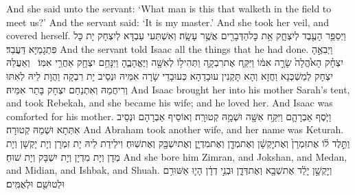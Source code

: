 {And she said unto the servant: ‘What man is this that walketh in the field to meet us?’ And the servant said: ‘It is my master.’ And she took her veil, and covered herself.}{}
{וַיְסַפֵּ֥ר הָעֶ֖בֶד לְיִצְחָ֑ק אֵ֥ת כׇּל\maqqaf הַדְּבָרִ֖ים אֲשֶׁ֥ר עָשָֽׂה׃}
{וְאִשְׁתַּעִי עַבְדָּא לְיִצְחָק יָת כָּל פִּתְגָמַיָּא דַּעֲבַד׃}
{And the servant told Isaac all the things that he had done.}{}
{וַיְבִאֶ֣הָ יִצְחָ֗ק הָאֹ֙הֱלָה֙ שָׂרָ֣ה אִמּ֔וֹ וַיִּקַּ֧ח אֶת\maqqaf רִבְקָ֛ה וַתְּהִי\maqqaf ל֥וֹ לְאִשָּׁ֖ה וַיֶּאֱהָבֶ֑הָ וַיִּנָּחֵ֥ם יִצְחָ֖ק אַחֲרֵ֥י אִמּֽוֹ׃ \petucha }
{וְאַעֲלַהּ יִצְחָק לְמַשְׁכְּנָא וַחֲזָא וְהָא תָּקְנִין עוּבָדַהָא כְּעוּבָדֵי שָׂרָה אִמֵּיהּ וּנְסֵיב יָת רִבְקָה וַהֲוָת לֵיהּ לְאִתּוּ וְרִיחֲמַהּ וְאִתְנַחַם יִצְחָק בָּתַר אִמֵּיהּ׃}
{And Isaac brought her into his mother Sarah’s tent, and took Rebekah, and she became his wife; and he loved her. And Isaac was comforted for his mother.}{}
\newperek
\newseder
{}%
{וַיֹּ֧סֶף אַבְרָהָ֛ם וַיִּקַּ֥ח אִשָּׁ֖ה וּשְׁמָ֥הּ קְטוּרָֽה׃}
{וְאוֹסֵיף אַבְרָהָם וּנְסֵיב אִתְּתָא וּשְׁמַהּ קְטוּרָה׃}
{And Abraham took another wife, and her name was Keturah.}{}
{וַתֵּ֣לֶד ל֗וֹ אֶת\maqqaf זִמְרָן֙ וְאֶת\maqqaf יׇקְשָׁ֔ן וְאֶת\maqqaf מְדָ֖ן וְאֶת\maqqaf מִדְיָ֑ן וְאֶת\maqqaf יִשְׁבָּ֖ק וְאֶת\maqqaf שֽׁוּחַ׃}
{וִילֵידַת לֵיהּ יָת זִמְרָן וְיָת יָקְשָׁן וְיָת מְדָן וְיָת מִדְיָן וְיָת יִשְׁבָּק וְיָת שׁוּחַ׃}
{And she bore him Zimran, and Jokshan, and Medan, and Midian, and Ishbak, and Shuah.}{}
{וְיׇקְשָׁ֣ן יָלַ֔ד אֶת\maqqaf שְׁבָ֖א וְאֶת\maqqaf דְּדָ֑ן וּבְנֵ֣י דְדָ֔ן הָי֛וּ אַשּׁוּרִ֥ם וּלְטוּשִׁ֖ם וּלְאֻמִּֽים׃}
